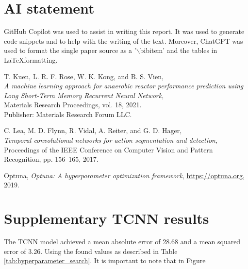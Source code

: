 \documentclass[conference]{IEEEtran}
\begin{document}
\section*{AI statement}
GitHub Copilot was used to assist in writing this report. It was used to generate code snippets and
to help with the writing of the text. Moreover, ChatGPT was used to format the single paper source 
as a '$\backslash$bibitem' and the tables in \LaTeX formatting.


\begin{thebibliography}{9}

    T. Kuen, L. R. F. Rose, W. K. Kong, and B. S. Vien,\\
    \textit{A machine learning approach for anaerobic reactor performance prediction using Long 
    Short-Term Memory Recurrent Neural Network},\\
    Materials Research Proceedings, vol. 18, 2021.\\
    Publisher: Materials Research Forum LLC.

    C. Lea, M. D. Flynn, R. Vidal, A. Reiter, and G. D. Hager,\\
    \textit{Temporal convolutional networks for action segmentation and detection},\\
    Proceedings of the IEEE Conference on Computer Vision and Pattern Recognition, pp. 156--165, 2017.

    Optuna, \textit{Optuna: A hyperparameter optimization framework}, \url{https://optuna.org}, 2019.
    
\end{thebibliography}

\clearpage
\onecolumn
\section*{Supplementary TCNN results}\label{suppltcnnresults}
The TCNN model achieved a mean absolute error of 28.68 and a mean squared error of 3.26. Using the
found values as described in Table \ref{tab:hyperparameter_search}. It is important to note that in
Figure 
\end{document}
